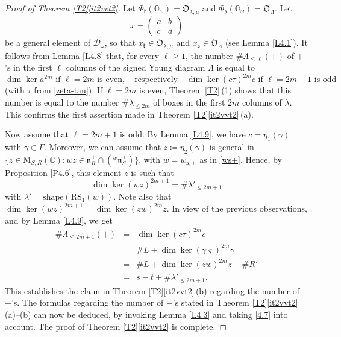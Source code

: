\documentclass[11pt]{article}
\theoremstyle{definition}
\numberwithin{equation}{section}
\newcommand{\fk}{\mathfrak{k}}
\newcommand{\fs}{\mathfrak{s}}
\newcommand{\fn}{\mathfrak{n}}
\newcommand{\RS}{\mathrm{RS}}
\newcommand{\shape}{\mathrm{shape}}
\newcommand{\card}[1]{\# #1}
\newcommand{\nrboxes}[2]{\# #1_{\leq #2}}
\newcommand{\nrplus}[2]{\# #1_{\leq #2}(+)}
\newcommand{\Mat}{\mathrm{M}}
\newcommand{\Xorbit}{\mathbb{O}}
\newcommand{\Nkorbit}{\mathfrak{O}}
\newcommand{\Nsorbit}{\mathfrak{O}}
\newcommand{\mC}{\mathbb{C}}
\begin{document}
\begin{proof}[Proof of Theorem \ref{T2}\ref{it2vvt2}]
Let $\Phi_\fk(\Xorbit_\omega)=\Nkorbit_{\lambda,\mu}$ and $\Phi_\fs(\Xorbit_\omega)=\Nsorbit_\Lambda$.
Let
\[x=\begin{pmatrix}a & b\\ c & d\end{pmatrix}\]
be a general element of $\mathcal{D}_\omega$, so that $x_\fk\in\Nkorbit_{\lambda,\mu}$ and $x_\fs\in\Nsorbit_\Lambda$
(see Lemma \ref{L4.1}).
It follows from Lemma \ref{L4.8} that, for every $\ell\geq 1$,
the number $\nrplus{\Lambda}{\ell}$ of $+$'s in the first $\ell$ columns of the signed Young diagram $\Lambda$ is equal to
\[\dim\ker a^{2m}\mbox{ if $\ell=2m$ is even},\quad\mbox{respectively}\quad \dim \ker(c\tau)^{2m} c\mbox{ if $\ell=2m+1$ is odd}\]
(with $\tau$ from \eqref{zeta-tau}).
If $\ell=2m$ is even, Theorem \ref{T2}\,(1) shows that this number is equal to the number $\nrboxes{\lambda}{2m}$ of boxes in the first $2m$ columns of $\lambda$.
This confirms the first assertion made in Theorem \ref{T2}\ref{it2vvt2}\,(a).

Now assume that $\ell=2m+1$ is odd. By Lemma \ref{L4.9}, we have $c=\eta_1(\gamma)$ with $\gamma\in\Gamma$. Moreover, we can assume that $z\coloneqq \eta_2(\gamma)$ is general in $\{z\in\Mat_{S,R}(\mC):wz\in\fn_R^+\cap({}^w\fn_S^+)\}$,
with $w=w_{\fs,+}$ as in \eqref{ws+}. Hence, by Proposition \ref{P4.6}, this element $z$ is such that
\[
\dim \ker (wz)^{2m+1}=\nrboxes{\lambda'}{2m+1}
\]
with $\lambda'=\shape(\RS_1(w))$.
Note also that $\dim\ker(wz)^{2m+1}=\dim\ker(zw)^{2m}z$. In view of the previous observations, and by Lemma \ref{L4.9}, we get
\begin{eqnarray*}
\nrplus{\Lambda}{2m+1} & = & \dim \ker(c\tau)^{2m} c\\ & = & \card{L}+\dim \ker (\gamma\varsigma)^{2m}\gamma\\
 & = & \card{L}+\dim \ker(zw)^{2m}z-\card{R'}\\
 & = & s-t+\nrboxes{\lambda'}{2m+1}.
\end{eqnarray*}
This establishes the claim in Theorem \ref{T2}\ref{it2vvt2}\,(b) regarding the number of $+$'s. The formulas regarding the number of $-$'s stated in Theorem \ref{T2}\ref{it2vvt2}\,(a)--(b) can now be deduced, by invoking Lemma \ref{L4.3} and taking \eqref{4.7} into account. The proof of Theorem \ref{T2}\ref{it2vvt2} is complete.
\end{proof}
\end{document}
